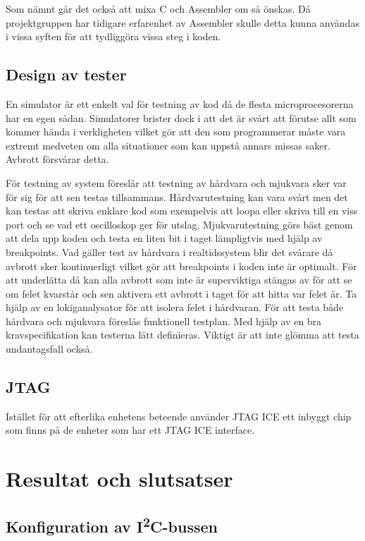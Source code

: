 \documentclass[11pt]{article}
\begin{document}
\begin{flushleft}
Som nämnt går det också att mixa C och Assembler om så önskas. Då projektgruppen har tidigare erfarenhet av Assembler skulle detta kunna användas i vissa syften för att tydliggöra vissa steg i koden. 

\subsection{Design av tester}
En simulator är ett enkelt val för testning av kod då de flesta microprocesorerna har en egen sådan. Simulatorer brister dock i att det är svårt att förutse allt som kommer hända i verkligheten vilket gör att den som programmerar måste vara extremt medveten om alla situationer som kan uppstå annars missas saker. Avbrott försvårar detta.\cite{RWD}

För testning av system föreslår \cite{RWD} att testning av hårdvara och mjukvara sker var för sig för att sen testas tillsammans. Hårdvarutestning kan vara svårt men det kan testas att skriva enklare kod som exempelvis att loopa eller skriva till en viss port och se vad ett oscilloskop ger för utslag. Mjukvarutestning görs bäst genom att dela upp koden och testa en liten bit i taget lämpligtvis med hjälp av breakpoints. Vad gäller test av hårdvara i realtidssystem blir det svårare då avbrott sker kontinuerligt vilket gör att breakpoints i koden inte är optimalt. För att underlätta då kan alla avbrott som inte är superviktiga stängas av för att se om felet kvarstår och sen aktivera ett avbrott i taget för att hitta var felet är. Ta hjälp av en lokiganalysator för att isolera felet i hårdvaran. För att testa både hårdvara och mjukvara föreslås funktionell testplan. Med hjälp av en bra kravspecifikation kan testerna lätt definieras. Viktigt är att inte glömma att testa undantagsfall också.

\subsection{JTAG}

Istället för att efterlika enhetens beteende använder JTAG ICE ett inbyggt chip som finns på de enheter som har ett JTAG ICE interface.

\pagebreak

\section{Resultat och slutsatser}

\subsection{Konfiguration av I\textsuperscript{2}C-bussen}


\end{flushleft}
\end{document}
